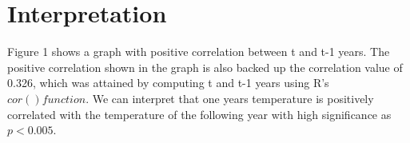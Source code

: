 \documentclass[12pt]{article}
\begin{document}
\section{Interpretation}
Figure 1 shows a graph with positive correlation between t and t-1 years. The positive correlation shown in the graph is also backed up the correlation value of 0.326, which was attained by computing t and t-1 years using R's $cor() function$. We can interpret that one years temperature is positively correlated with the temperature of the following year with high significance as $p<0.005$.
\end{document}
